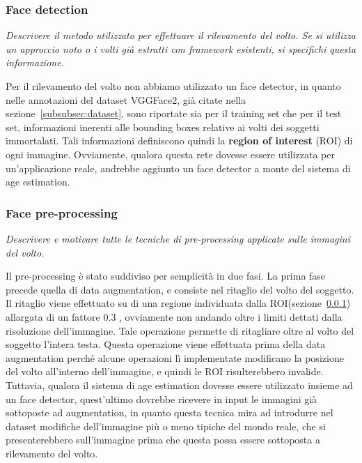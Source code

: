 \subsubsection{Face detection}
\label{subsubsec:face_detection}

\emph{Descrivere il metodo utilizzato per effettuare il rilevamento del volto. Se si utilizza un approccio noto o i volti già estratti con framework esistenti, si specifichi questa informazione.}

Per il rilevamento del volto non abbiamo utilizzato un face detector, in quanto nelle annotazioni del dataset VGGFace2, già citate nella sezione~\ref{subsubsec:dataset}, sono riportate sia per il training set che per il test set, informazioni inerenti alle bounding boxes relative ai volti dei soggetti immortalati. Tali informazioni definiscono quindi la \textbf{region of interest} (ROI) di ogni immagine.
Ovviamente, qualora questa rete dovesse essere utilizzata per un'applicazione reale, andrebbe aggiunto un face detector a monte del sistema di age estimation. 

\subsubsection{Face pre-processing} 

\emph{Descrivere e motivare tutte le tecniche di pre-processing applicate sulle immagini del volto.}

Il pre-processing è stato suddiviso per semplicità in due fasi. La prima fase precede quella di data augmentation, e consiste nel ritaglio del volto del soggetto. Il ritaglio viene effettuato su di una regione individuata dalla ROI(sezione~\ref{subsubsec:face_detection}) allargata di un fattore $0.3$ , ovviamente non andando oltre i limiti dettati dalla risoluzione dell'immagine. Tale operazione permette di ritagliare oltre al volto del soggetto l'intera testa. Questa operazione viene effettuata prima della data augmentation perché alcune operazioni lì implementate modificano la posizione del volto all'interno dell'immagine, e quindi le ROI risulterebbero invalide. Tuttavia, qualora il sistema di age estimation dovesse essere utilizzato insieme ad un face detector, quest'ultimo dovrebbe ricevere in input le immagini già sottoposte ad augmentation, in quanto questa tecnica mira ad introdurre nel dataset modifiche dell'immagine più o meno tipiche del mondo reale, che si presenterebbero sull'immagine prima che questa possa essere sottoposta a rilevamento del volto.

